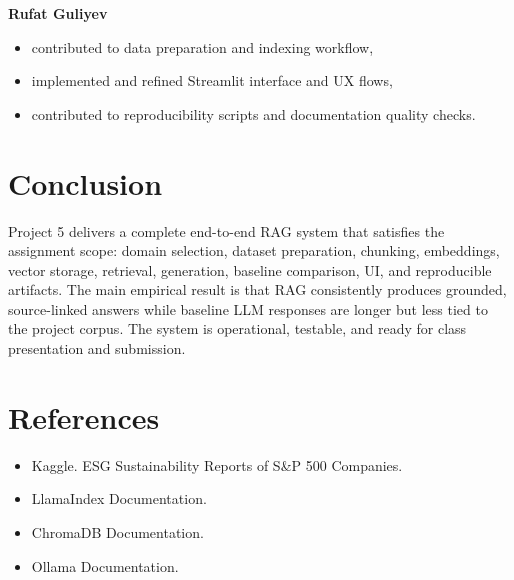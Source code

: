 \documentclass[11pt]{article}
\begin{document}
\textbf{Rufat Guliyev}
\begin{itemize}
    \item contributed to data preparation and indexing workflow,
    \item implemented and refined Streamlit interface and UX flows,
    \item contributed to reproducibility scripts and documentation quality checks.
\end{itemize}

\section{Conclusion}
Project 5 delivers a complete end-to-end RAG system that satisfies the assignment scope: domain selection, dataset preparation, chunking, embeddings, vector storage, retrieval, generation, baseline comparison, UI, and reproducible artifacts. The main empirical result is that RAG consistently produces grounded, source-linked answers while baseline LLM responses are longer but less tied to the project corpus. The system is operational, testable, and ready for class presentation and submission.

\section*{References}
\begin{itemize}
    \item Kaggle. ESG Sustainability Reports of S\&P 500 Companies.
    \item LlamaIndex Documentation.
    \item ChromaDB Documentation.
    \item Ollama Documentation.
\end{itemize}
\end{document}
